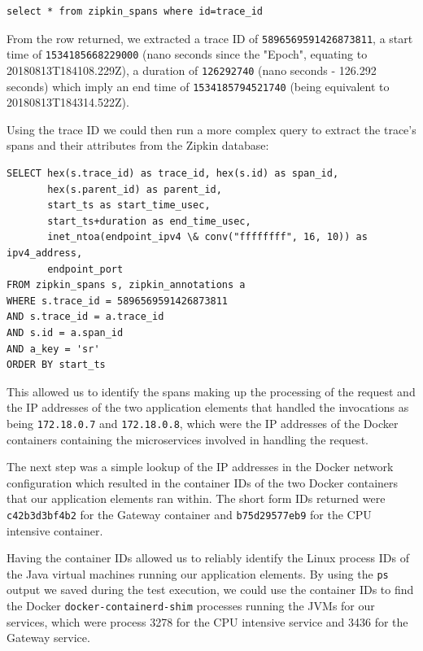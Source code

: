 \lstset{language=SQL}
\begin{lstlisting}
select * from zipkin_spans where id=trace_id
\end{lstlisting}


From the row returned, we extracted a trace ID of \texttt{5896569591426873811}, a start time of \texttt{1534185668229000} (nano seconds since the "Epoch", equating to 20180813T184108.229Z), a duration of \texttt{126292740} (nano seconds - 126.292 seconds)	which imply an end time of \texttt{1534185794521740} (being equivalent to 20180813T184314.522Z).

Using the trace ID we could then run a more complex query to extract the trace's spans and their attributes from the Zipkin database:

\lstset{language=SQL}
\begin{lstlisting}
SELECT hex(s.trace_id) as trace_id, hex(s.id) as span_id,
       hex(s.parent_id) as parent_id,
       start_ts as start_time_usec, 
       start_ts+duration as end_time_usec,
       inet_ntoa(endpoint_ipv4 \& conv("ffffffff", 16, 10)) as ipv4_address,
       endpoint_port
FROM zipkin_spans s, zipkin_annotations a
WHERE s.trace_id = 5896569591426873811
AND s.trace_id = a.trace_id
AND s.id = a.span_id
AND a_key = 'sr'
ORDER BY start_ts
\end{lstlisting}

This allowed us to identify the spans making up the processing of the request and the IP addresses of the two application elements that handled the invocations as being \texttt{172.18.0.7} and \texttt{172.18.0.8}, which were the IP addresses of the Docker containers containing the microservices involved in handling the request.

The next step was a simple lookup of the IP addresses in the Docker network configuration which resulted in the container IDs of the two Docker containers that our application elements ran within.  The short form IDs returned were \texttt{c42b3d3bf4b2} for the Gateway container and \texttt{b75d29577eb9} for the CPU intensive container.

Having the container IDs allowed us to reliably identify the Linux process IDs of the Java virtual machines running our application elements.  By using the \texttt{ps} output we saved during the test execution, we could use the container IDs to find the Docker \texttt{docker-containerd-shim}  processes running the JVMs for our services, which were process 3278 for the CPU intensive service and 3436 for the Gateway service.

